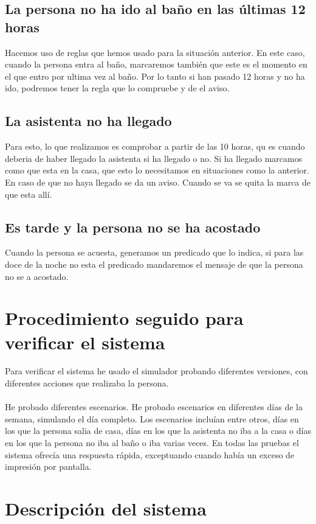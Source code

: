 \documentclass[12pt,a4paper]{article}
\begin{document}
\subsection{La persona no ha ido al baño en las últimas 12 horas}
Hacemos uso de reglas que hemos usado para la situación anterior. En este caso, cuando la persona entra al baño, marcaremos también  que este es el momento en el que entro por ultima vez al baño. Por lo tanto si han pasado 12 horas y no ha ido, podremos tener la regla que lo compruebe y de el aviso.
\subsection{La asistenta no ha llegado}
Para esto, lo que realizamos es comprobar a partir de las 10 horas, qu es cuando deberia de haber llegado la asistenta si ha llegado o no. Si ha llegado marcamos como que esta en la casa, que esto lo necesitamos en situaciones como la anterior. En caso de que no haya llegado se da un aviso. Cuando se va se quita la marca de que esta allí. 
\subsection{Es tarde y la persona no se ha acostado}
Cuando la persona se acuesta, generamos un predicado que lo indica, si para las doce de la noche no esta el predicado mandaremos el mensaje de que la persona no se a acostado. 
\section{Procedimiento seguido para verificar el sistema}
Para verificar el sistema he usado el simulador probando diferentes versiones, con diferentes acciones que realizaba la persona. \\\\
He probado diferentes escenarios. He probado escenarios en diferentes días de la semana, simulando el día completo. Los escenarios incluían entre otros, días en los que la persona salia de casa, días en los que la asistenta no iba a la casa o días en los que la persona no iba al baño o iba varias veces. En todas las pruebas el sistema ofrecía una respuesta rápida, exceptuando cuando había un exceso de impresión por pantalla. 
\section{Descripción del sistema}
\end{document}
